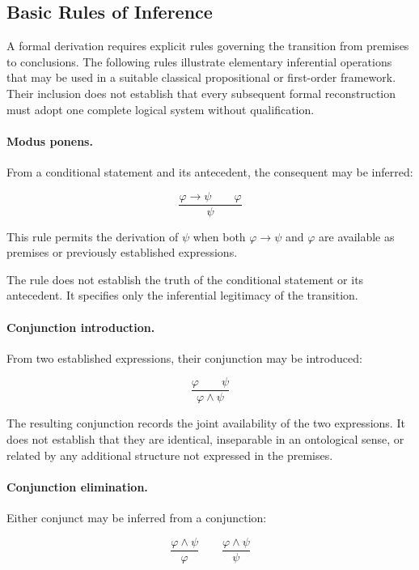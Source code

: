 \subsection{Basic Rules of Inference}

A formal derivation requires explicit rules governing the transition
from premises to conclusions. The following rules illustrate
elementary inferential operations that may be used in a suitable
classical propositional or first-order framework. Their inclusion
does not establish that every subsequent formal reconstruction must
adopt one complete logical system without qualification.

\paragraph{Modus ponens.}

From a conditional statement and its antecedent, the consequent
may be inferred:

\[
\frac{\varphi \rightarrow \psi \qquad \varphi}
     {\psi}
\]

This rule permits the derivation of \(\psi\) when both
\(\varphi \rightarrow \psi\) and \(\varphi\) are available as
premises or previously established expressions.

The rule does not establish the truth of the conditional statement
or its antecedent. It specifies only the inferential legitimacy of
the transition.

\paragraph{Conjunction introduction.}

From two established expressions, their conjunction may be
introduced:

\[
\frac{\varphi \qquad \psi}
     {\varphi \land \psi}
\]

The resulting conjunction records the joint availability of the
two expressions. It does not establish that they are identical,
inseparable in an ontological sense, or related by any additional
structure not expressed in the premises.

\paragraph{Conjunction elimination.}

Either conjunct may be inferred from a conjunction:

\[
\frac{\varphi \land \psi}
     {\varphi}
\qquad
\frac{\varphi \land \psi}
     {\psi}
\]

